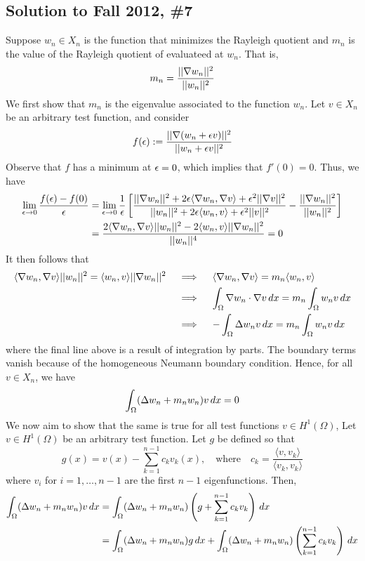 \subsection*{Solution to Fall 2012, \#7}
\label{F12Q7}

Suppose $w_n \in X_n$ is the function that minimizes the Rayleigh quotient and $m_n$ is the value of the Rayleigh quotient of evaluateed at $w_n$. That is,
\[
m_n = \frac{||\nabla w_n||^2}{||w_n||^2}
\]
We first show that $m_n$ is the eigenvalue associated to the function $w_n$. Let $v \in X_n$ be an arbitrary test function, and consider
\[
f(\epsilon) := \frac{|| \nabla (w_n+\epsilon v)||^2}{||w_n+\epsilon v||^2}
\]
Observe that $f$ has a minimum at $\epsilon = 0$, which implies that $f'(0) = 0$. Thus, we have
\begin{align*}
\lim_{\epsilon \to 0} \frac{f(\epsilon) - f(0)}{\epsilon} &= \lim_{\epsilon \to 0} \frac{1}{\epsilon} \left[ \frac{ || \nabla w_n||^2 + 2\epsilon \langle \nabla w_n, \nabla v \rangle + \epsilon^2 ||\nabla v||^2}{||w_n||^2 + 2\epsilon \langle w_n, v \rangle + \epsilon^2 ||v||^2} - \frac{|| \nabla w_n||^2}{||w_n||^2} \right] \\
&= \frac{2 \langle \nabla w_n, \nabla v \rangle ||w_n||^2 - 2 \langle w_n, v \rangle ||\nabla w_n||^2}{||w_n||^4} = 0
\end{align*}
It then follows that
\begin{align*}
\langle \nabla w_n, \nabla v \rangle ||w_n||^2  = \langle w_n,v \rangle ||\nabla w_n||^2 \quad &\implies \quad  \langle \nabla w_n, \nabla v \rangle = m_n \langle w_n, v\rangle \\
&\implies \quad \int_{\Omega} \nabla w_n \cdot \nabla v \, dx = m_n \int_{\Omega} w_nv \, dx \\
&\implies \quad -\int_{\Omega} \Delta w_n v \, dx = m_n \int_{\Omega} w_nv \, dx
\end{align*}
where the final line above is a result of integration by parts. The boundary terms vanish because of the homogeneous Neumann boundary condition. Hence, for all $v \in X_n$, we have
\[
\int_{\Omega} (\Delta w_n + m_n w_n) v \, dx = 0
\]
We now aim to show that the same is true for all test functions $v \in H^1(\Omega)$, Let $v \in H^1(\Omega)$ be an arbitrary test function. Let $g$ be defined so that
\[
g(x) = v(x) - \sum_{k=1}^{n-1} c_k v_k(x), \quad \text{where} \quad c_k = \frac{ \langle v, v_k \rangle}{\langle v_k, v_k \rangle}
\]
where $v_i$ for $i=1, \dots, n-1$ are the first $n-1$ eigenfunctions. Then,
\begin{align}
\notag \int_{\Omega} (\Delta w_n + m_n w_n)v \, dx  &= \int_{\Omega} (\Delta w_n + m_n w_n) \left( g + \sum_{k=1}^{n-1} c_k v_k \right) \, dx \\
\label{f127eq} &= \int_{\Omega} (\Delta w_n + m_n w_n)g\, dx + \int_{\Omega} (\Delta w_n + m_n w_n) \left( \sum_{k=1}^{n-1} c_k v_k \right) \, dx
\end{align}
